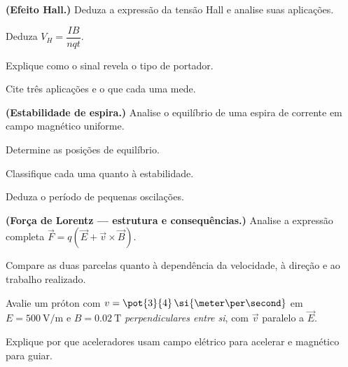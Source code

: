 \begin{questao}[4]{}

\textbf{(Efeito Hall.)} Deduza a expressão da tensão Hall e analise suas
aplicações.
\begin{itensq}
\item Deduza $V_H=\dfrac{IB}{nqt}$.
\item Explique como o sinal revela o tipo de portador.
\item Cite três aplicações e o que cada uma mede.
\end{itensq}


\end{questao}
\begin{questao}[4]{}

\textbf{(Estabilidade de espira.)} Analise o equilíbrio de uma espira de
corrente em campo magnético uniforme.
\begin{itensq}
\item Determine as posições de equilíbrio.
\item Classifique cada uma quanto à estabilidade.
\item Deduza o período de pequenas oscilações.
\end{itensq}


\end{questao}
\begin{questao}[4]{}

\textbf{(Força de Lorentz --- estrutura e consequências.)} Analise a expressão
completa $\vec F=q\left(\vec E+\vec v\times\vec B\right)$.
\begin{itensq}
\item Compare as duas parcelas quanto à dependência da velocidade, à direção e
      ao trabalho realizado.
\item Avalie um próton com $v=\pot{3}{4}\,\si{\meter\per\second}$ em
      $E=\SI{500}{\volt\per\meter}$ e $B=\SI{0.02}{\tesla}$
      \emph{perpendiculares entre si}, com $\vec v$ paralelo a $\vec E$.
\item Explique por que aceleradores usam campo elétrico para acelerar e
      magnético para guiar.
\end{itensq}


\end{questao}
